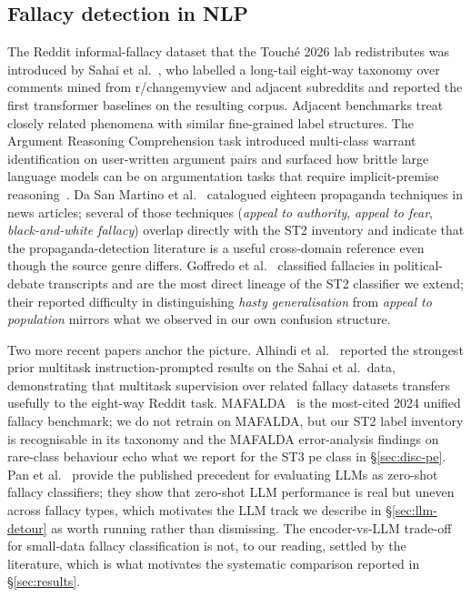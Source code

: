 \subsection{Fallacy detection in NLP}
\label{sec:bg-fallacy}

The Reddit informal-fallacy dataset that the Touch\'{e} 2026 lab redistributes was introduced by Sahai et al.~\cite{sahai2021invisiblewall}, who labelled a long-tail eight-way taxonomy over comments mined from r/changemyview and adjacent subreddits and reported the first transformer baselines on the resulting corpus. Adjacent benchmarks treat closely related phenomena with similar fine-grained label structures. The Argument Reasoning Comprehension task introduced multi-class warrant identification on user-written argument pairs and surfaced how brittle large language models can be on argumentation tasks that require implicit-premise reasoning~\cite{habernal2018arc}. Da San Martino et al.~\cite{dasanmartino2019propaganda} catalogued eighteen propaganda techniques in news articles; several of those techniques (\emph{appeal to authority}, \emph{appeal to fear}, \emph{black-and-white fallacy}) overlap directly with the ST2 inventory and indicate that the propaganda-detection literature is a useful cross-domain reference even though the source genre differs. Goffredo et al.~\cite{goffredo2022political} classified fallacies in political-debate transcripts and are the most direct lineage of the ST2 classifier we extend; their reported difficulty in distinguishing \emph{hasty generalisation} from \emph{appeal to population} mirrors what we observed in our own confusion structure.

Two more recent papers anchor the picture. Alhindi et al.~\cite{alhindi2022multitask} reported the strongest prior multitask instruction-prompted results on the Sahai et al.\ data, demonstrating that multitask supervision over related fallacy datasets transfers usefully to the eight-way Reddit task. MAFALDA~\cite{helwe2024mafalda} is the most-cited 2024 unified fallacy benchmark; we do not retrain on MAFALDA, but our ST2 label inventory is recognisable in its taxonomy and the MAFALDA error-analysis findings on rare-class behaviour echo what we report for the ST3 \textsf{pe} class in \S\ref{sec:disc-pe}. Pan et al.~\cite{pan2024zeroshotfallacy} provide the published precedent for evaluating LLMs as zero-shot fallacy classifiers; they show that zero-shot LLM performance is real but uneven across fallacy types, which motivates the LLM track we describe in \S\ref{sec:llm-detour} as worth running rather than dismissing. The encoder-vs-LLM trade-off for small-data fallacy classification is not, to our reading, settled by the literature, which is what motivates the systematic comparison reported in \S\ref{sec:results}.

